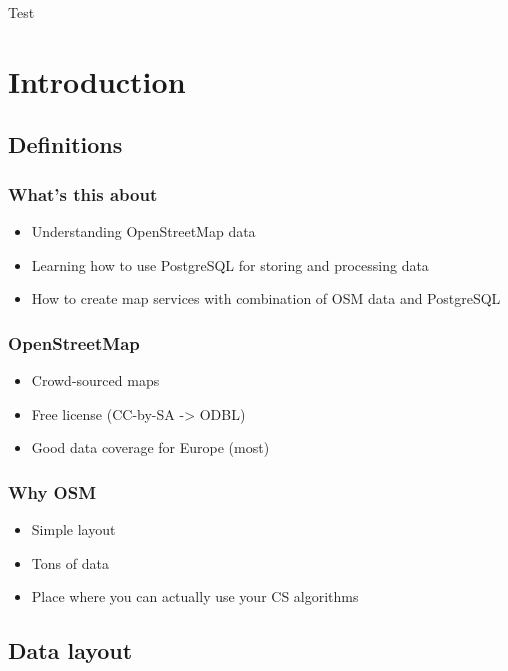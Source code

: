\documentclass{beamer}
\begin{document}
\begin{frame}{Test}
  \begin{center}
    
  \end{center}
\end{frame}

\section{Introduction}

\subsection{Definitions}
\label{sec:definitions}

\begin{frame}
  \frametitle{What's this about}
  \begin{itemize}
  \item Understanding OpenStreetMap data
  \item Learning how to use PostgreSQL for storing and processing data
  \item How to create map services with combination of OSM data and PostgreSQL
  \end{itemize}
\end{frame}

\begin{frame}
  \frametitle{OpenStreetMap}
  \begin{itemize}
  \item Crowd-sourced maps
  \item Free license (CC-by-SA -> ODBL)
  \item Good data coverage for Europe (most)
  \end{itemize}
\end{frame}

\begin{frame}
  \frametitle{Why OSM}
  \begin{itemize}
  \item Simple layout
  \item Tons of data
  \item Place where you can actually use your CS algorithms
  \end{itemize}
\end{frame}

\subsection{Data layout}
\label{sec:diving}
\end{document}

